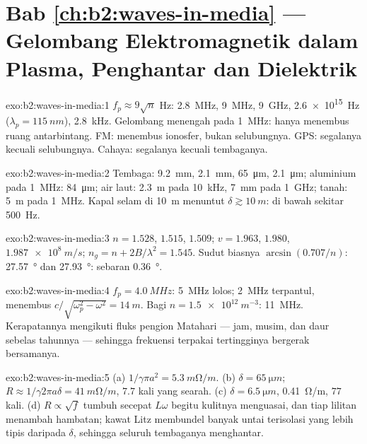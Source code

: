 \section*{Bab \ref{ch:b2:waves-in-media} --- Gelombang Elektromagnetik dalam Plasma, Penghantar dan Dielektrik}

\begin{solution}{exo:b2:waves-in-media:1}
$f_p \approx 9\sqrt n$ Hz: \qty{2.8}{MHz}, \qty{9}{MHz}, \qty{9}{GHz}, \qty{2.6e15}{Hz}
($\lambda_p = \qty{115}{nm}$), \qty{2.8}{kHz}. Gelombang menengah pada \qty{1}{MHz}: hanya menembus
ruang antarbintang. FM: menembus ionosfer, bukan selubungnya. GPS:
segalanya kecuali selubungnya. Cahaya: segalanya kecuali tembaganya.
\end{solution}

\begin{solution}{exo:b2:waves-in-media:2}
Tembaga: \qty{9.2}{mm}, \qty{2.1}{mm}, \qty{65}{\micro m}, \qty{2.1}{\micro m}; aluminium pada
\qty{1}{MHz}: \qty{84}{\micro m}; air laut: \qty{2.3}{m} pada \qty{10}{kHz}, \qty{7}{mm} pada
\qty{1}{GHz}; tanah: \qty{5}{m} pada \qty{1}{MHz}. Kapal selam di \qty{10}{m} menuntut $\delta
\gtrsim \qty{10}{m}$: di bawah sekitar \qty{500}{Hz}.
\end{solution}

\begin{solution}{exo:b2:waves-in-media:3}
$n = 1.528$, $1.515$, $1.509$; $v = 1.963$, $1.980$, $\qty{1.987e8}{m/s}$; $n_g = n +
2B/\lambda^2 = 1.545$. Sudut biasnya $\arcsin(0.707/n)$: \qty{27.57}{\degree} dan
\qty{27.93}{\degree}: sebaran \qty{0.36}{\degree}.
\end{solution}

\begin{solution}{exo:b2:waves-in-media:4}
$f_p = \qty{4.0}{MHz}$: \qty{5}{MHz} lolos; \qty{2}{MHz} terpantul, menembus
$c/\sqrt{\omega_p^2 - \omega^2} = \qty{14}{m}$. Bagi $n = \qty{1.5e12}{m^{-3}}$: \qty{11}{MHz}.
Kerapatannya mengikuti fluks pengion Matahari --- jam, musim, dan
daur sebelas tahunnya --- sehingga frekuensi terpakai tertingginya bergerak bersamanya.
\end{solution}

\begin{solution}{exo:b2:waves-in-media:5}
(a) $1/\gamma\pi a^2 = \qty{5.3}{m\ohm/m}$. (b) $\delta = \qty{65}{\micro m}$; $R \approx 1/\gamma2\pi a\delta
= \qty{41}{m\ohm/m}$, $7.7$ kali yang searah. (c) $\delta = \qty{6.5}{\micro m}$, \qty{0.41}{\ohm/m},
$77$ kali. (d) $R \propto \sqrt f$ tumbuh secepat $L\omega$ begitu kulitnya
menguasai, dan tiap lilitan menambah hambatan; kawat Litz membundel banyak
untai terisolasi yang lebih tipis daripada $\delta$, sehingga seluruh tembaganya menghantar.
\end{solution}

